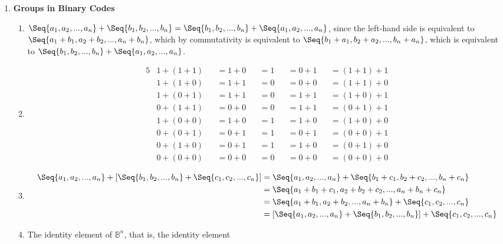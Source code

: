 \begin{enumerate}[label={\Alph*.},font={\bfseries}]
\begin{figure}[h]
  \end{figure}
\item {\bf Groups in Binary Codes}
  \begin{enumerate}[label={\arabic*},font={\bfseries}]
  \item $\Seq{a_1,a_2,...,a_n} + \Seq{b_1,b_2,...,b_n} = \Seq{b_1,b_2,...,b_n} + \Seq{a_1,a_2,...,a_n}$,
    since the left-hand side is equivalent to $\Seq{a_1+b_1,a_2+b_2,...,a_n+b_n}$,
    which by commutativity is equivalent to $\Seq{b_1+a_1,b_2+a_2,...,b_n+a_n}$,
    which is equivalent to $\Seq{b_1,b_2,...,b_n} + \Seq{a_1,a_2,...,a_n}$.
  \item
    \begin{alignat*}{5}
      &1 + (1 + 1) &&= 1 + 0 &&= 1 &&= 0 + 1 &&= (1 + 1) + 1 \\
      &1 + (1 + 0) &&= 1 + 1 &&= 0 &&= 0 + 0 &&= (1 + 1) + 0 \\
      &1 + (0 + 1) &&= 1 + 1 &&= 0 &&= 1 + 1 &&= (1 + 0) + 1 \\
      &0 + (1 + 1) &&= 0 + 0 &&= 0 &&= 1 + 1 &&= (0 + 1) + 1 \\
      &1 + (0 + 0) &&= 1 + 0 &&= 1 &&= 1 + 0 &&= (1 + 0) + 0 \\
      &0 + (0 + 1) &&= 0 + 1 &&= 1 &&= 0 + 1 &&= (0 + 0) + 1 \\
      &0 + (1 + 0) &&= 0 + 1 &&= 1 &&= 1 + 0 &&= (0 + 1) + 0 \\
      &0 + (0 + 0) &&= 0 + 0 &&= 0 &&= 0 + 0 &&= (0 + 0) + 0
    \end{alignat*}
  \item
    \begin{align*}
      \Seq{a_1,a_2,...,a_n} + \left[\Seq{b_1,b_2,...,b_n} + \Seq{c_1,c_2,...,c_n}\right]
      &= \Seq{a_1,a_2,...,a_n} + \Seq{b_1+c_1,b_2+c_2,...,b_n+c_n} \\
      &= \Seq{a_1+b_1+c_1,a_2+b_2+c_2,...,a_n+b_n+c_n} \\
      &= \Seq{a_1+b_1,a_2+b_2,...,a_n+b_n} + \Seq{c_1,c_2,...,c_n} \\
      &= \left[\Seq{a_1,a_2,...,a_n} + \Seq{b_1,b_2,...,b_n}\right] + \Seq{c_1,c_2,...,c_n}
    \end{align*}
    \item The identity element of $\mathbb{B}^n$, that is, the identity element

\end{enumerate}
\end{enumerate}
